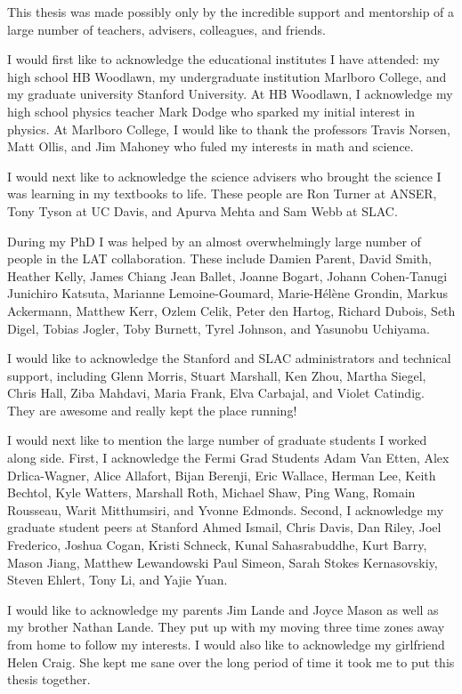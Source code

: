 
This thesis was made possibly only by the incredible support and
mentorship of a large number of teachers, advisers, colleagues, and
friends.

I would first like to acknowledge the educational institutes I have
attended: my high school HB Woodlawn, my undergraduate institution
Marlboro College, and my graduate university Stanford University.  At HB
Woodlawn, I acknowledge my high school physics teacher Mark Dodge who
sparked my initial interest in physics. At Marlboro College, I would
like to thank the professors Travis Norsen, Matt Ollis, and Jim Mahoney
who fuled my interests in math and science.

I would next like to acknowledge the science advisers who brought the
science I was learning in my textbooks to life.  These people are Ron
Turner at ANSER, Tony Tyson at UC Davis, and Apurva Mehta and Sam Webb
at SLAC.

During my PhD I was helped by an almost overwhelmingly large number
of people in the \gls{LAT} collaboration.  These include Damien Parent,
David Smith, Heather Kelly, James Chiang Jean Ballet, Joanne Bogart, Johann
Cohen-Tanugi Junichiro Katsuta, Marianne Lemoine-Goumard, Marie-H\'el\`ene
Grondin, Markus Ackermann, Matthew Kerr, Ozlem Celik, Peter den Hartog,
Richard Dubois, Seth Digel, Tobias Jogler, Toby Burnett, Tyrel Johnson,
and Yasunobu Uchiyama.

I would like to acknowledge the Stanford and SLAC administrators and
technical support, including Glenn Morris, Stuart Marshall, Ken Zhou,
Martha Siegel, Chris Hall, Ziba Mahdavi, Maria Frank, Elva Carbajal,
and Violet Catindig.  They are awesome and really kept the place running!

I would next like to mention the large number of graduate students I
worked along side.  First, I acknowledge the Fermi Grad Students Adam Van
Etten, Alex Drlica-Wagner, Alice Allafort, Bijan Berenji, Eric Wallace,
Herman Lee, Keith Bechtol, Kyle Watters, Marshall Roth, Michael Shaw, Ping
Wang, Romain Rousseau, Warit Mitthumsiri, and Yvonne Edmonds.  Second,
I acknowledge my graduate student peers at Stanford Ahmed Ismail, Chris
Davis, Dan Riley, Joel Frederico, Joshua Cogan, Kristi Schneck, Kunal
Sahasrabuddhe, Kurt Barry, Mason Jiang, Matthew Lewandowski Paul Simeon,
Sarah Stokes Kernasovskiy, Steven Ehlert, Tony Li, and Yajie Yuan.

I would like to acknowledge my parents Jim Lande and Joyce Mason as well
as my brother Nathan Lande. They put up with my moving three time zones
away from home to follow my interests. I would also like to acknowledge
my girlfriend Helen Craig. She kept me sane over the long period of time
it took me to put this thesis together.

